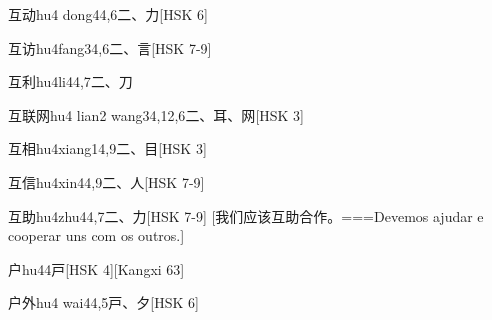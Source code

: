 \begin{EntryWithPhonetic}{互动}{hu4 dong4}{4,6}{⼆、⼒}[HSK 6]
\end{EntryWithPhonetic}

\begin{EntryWithPhonetic}{互访}{hu4fang3}{4,6}{⼆、⾔}[HSK 7-9]
\end{EntryWithPhonetic}

\begin{EntryWithPhonetic}{互利}{hu4li4}{4,7}{⼆、⼑}
\end{EntryWithPhonetic}

\begin{EntryWithPhonetic}{互联网}{hu4 lian2 wang3}{4,12,6}{⼆、⽿、⽹}[HSK 3]
\end{EntryWithPhonetic}

\begin{EntryWithPhonetic}{互相}{hu4xiang1}{4,9}{⼆、⽬}[HSK 3]
\end{EntryWithPhonetic}

\begin{EntryWithPhonetic}{互信}{hu4xin4}{4,9}{⼆、⼈}[HSK 7-9]
\end{EntryWithPhonetic}

\begin{EntryWithPhonetic}{互助}{hu4zhu4}{4,7}{⼆、⼒}[HSK 7-9]
  [我们应该互助合作。===Devemos ajudar e cooperar uns com os outros.]
\end{EntryWithPhonetic}

\begin{EntryWithPhonetic}{户}{hu4}{4}{⼾}[HSK 4][Kangxi 63]
\end{EntryWithPhonetic}

\begin{EntryWithPhonetic}{户外}{hu4 wai4}{4,5}{⼾、⼣}[HSK 6]
\end{EntryWithPhonetic}

